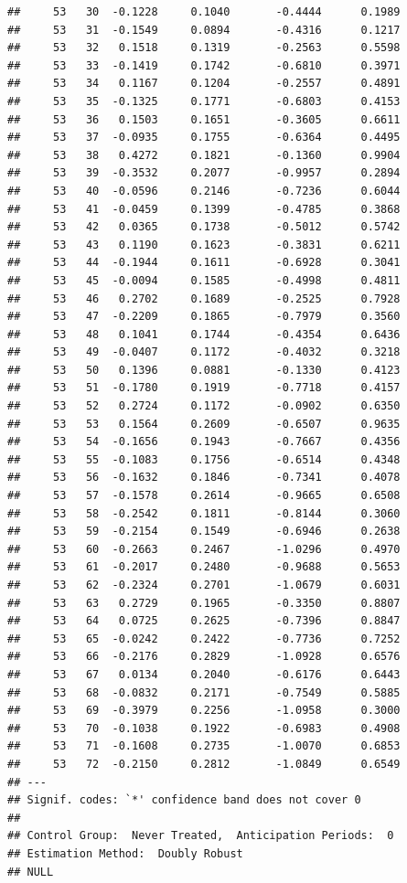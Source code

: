 \documentclass[
]{article}
\begin{document}
\begin{verbatim}
##     53   30  -0.1228     0.1040       -0.4444      0.1989  
##     53   31  -0.1549     0.0894       -0.4316      0.1217  
##     53   32   0.1518     0.1319       -0.2563      0.5598  
##     53   33  -0.1419     0.1742       -0.6810      0.3971  
##     53   34   0.1167     0.1204       -0.2557      0.4891  
##     53   35  -0.1325     0.1771       -0.6803      0.4153  
##     53   36   0.1503     0.1651       -0.3605      0.6611  
##     53   37  -0.0935     0.1755       -0.6364      0.4495  
##     53   38   0.4272     0.1821       -0.1360      0.9904  
##     53   39  -0.3532     0.2077       -0.9957      0.2894  
##     53   40  -0.0596     0.2146       -0.7236      0.6044  
##     53   41  -0.0459     0.1399       -0.4785      0.3868  
##     53   42   0.0365     0.1738       -0.5012      0.5742  
##     53   43   0.1190     0.1623       -0.3831      0.6211  
##     53   44  -0.1944     0.1611       -0.6928      0.3041  
##     53   45  -0.0094     0.1585       -0.4998      0.4811  
##     53   46   0.2702     0.1689       -0.2525      0.7928  
##     53   47  -0.2209     0.1865       -0.7979      0.3560  
##     53   48   0.1041     0.1744       -0.4354      0.6436  
##     53   49  -0.0407     0.1172       -0.4032      0.3218  
##     53   50   0.1396     0.0881       -0.1330      0.4123  
##     53   51  -0.1780     0.1919       -0.7718      0.4157  
##     53   52   0.2724     0.1172       -0.0902      0.6350  
##     53   53   0.1564     0.2609       -0.6507      0.9635  
##     53   54  -0.1656     0.1943       -0.7667      0.4356  
##     53   55  -0.1083     0.1756       -0.6514      0.4348  
##     53   56  -0.1632     0.1846       -0.7341      0.4078  
##     53   57  -0.1578     0.2614       -0.9665      0.6508  
##     53   58  -0.2542     0.1811       -0.8144      0.3060  
##     53   59  -0.2154     0.1549       -0.6946      0.2638  
##     53   60  -0.2663     0.2467       -1.0296      0.4970  
##     53   61  -0.2017     0.2480       -0.9688      0.5653  
##     53   62  -0.2324     0.2701       -1.0679      0.6031  
##     53   63   0.2729     0.1965       -0.3350      0.8807  
##     53   64   0.0725     0.2625       -0.7396      0.8847  
##     53   65  -0.0242     0.2422       -0.7736      0.7252  
##     53   66  -0.2176     0.2829       -1.0928      0.6576  
##     53   67   0.0134     0.2040       -0.6176      0.6443  
##     53   68  -0.0832     0.2171       -0.7549      0.5885  
##     53   69  -0.3979     0.2256       -1.0958      0.3000  
##     53   70  -0.1038     0.1922       -0.6983      0.4908  
##     53   71  -0.1608     0.2735       -1.0070      0.6853  
##     53   72  -0.2150     0.2812       -1.0849      0.6549  
## ---
## Signif. codes: `*' confidence band does not cover 0
## 
## Control Group:  Never Treated,  Anticipation Periods:  0
## Estimation Method:  Doubly Robust
## NULL
\end{verbatim}
\end{document}
